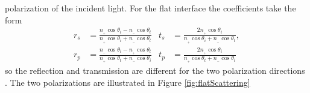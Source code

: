 polarization of the incident light. For the flat interface the coefficients take the form
%
\begin{subequations}
\label{flatFresnelCoeff}
\begin{align}
   r_s &= \frac{n\!_{_+} \cos \theta_i - n\!_{_-} \cos \theta_t}
   {n\!_{_+} \cos \theta_i + n\!_{_-} \cos \theta_t}     
   &t_s &= \frac{2 n\!_{_+} \cos \theta_i}
   {n\!_{_+} \cos \theta_i + n\!_{_-} \cos \theta_t}, \label{flatFresnelCoeffs} \\
%
   r_p &= \frac{n\!_{_-} \cos \theta_i - n\!_{_+} \cos \theta_t}
   {n\!_{_+} \cos \theta_t + n\!_{_-} \cos \theta_i}     
   &t_p &= \frac{2 n\!_{_+} \cos \theta_i}
   {n\!_{_+} \cos \theta_t + n\!_{_-} \cos \theta_i}     \label{flatFresnelCoeffp}
\end{align}
\end{subequations}
%
so the reflection and transmission are different for the two polarization directions \cite[p.~121-123]{Smith}.
The two polarizations are illustrated in Figure \ref{fig:flatScattering}

